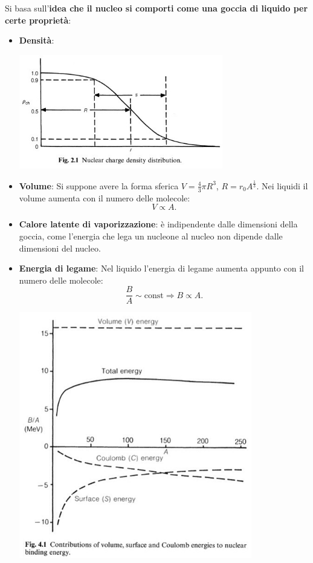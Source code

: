\documentclass[a4paper,11pt,twoside,openany]{book}
\theoremstyle{definition}
\theoremstyle{plain}
\theoremstyle{plain}
\theoremstyle{definition}
\begin{document}
Si basa sull'\textbf{idea che il nucleo si comporti come una goccia di liquido per certe proprietà}:
\begin{itemize}
\item \textbf{Densità}: 
\begin{center}
\includegraphics[width=3.5in]{immagini/mass_density.jpg} %
\end{center}
\item \textbf{Volume}: Si suppone avere la forma sferica $V=\frac{4}{3}\pi R^3$, $R=r_0A^{\frac{1}{3}}$. Nei liquidi il volume aumenta con il numero delle molecole:
\begin{equation}
V\propto A.
\end{equation}
\item \textbf{Calore latente di vaporizzazione}: è indipendente dalle dimensioni della goccia, come l'energia che lega un nucleone al nucleo non dipende dalle dimensioni del nucleo.
\item \textbf{Energia di legame}: Nel liquido l'energia di legame aumenta appunto con il numero delle molecole:
\begin{equation}
\frac{B}{A}\sim \textrm{const} \Longrightarrow B\propto A.
\end{equation}
\begin{center}
\includegraphics[width=4in]{immagini/density_liquid.jpg} %
\end{center}
\end{itemize}
\end{document}
